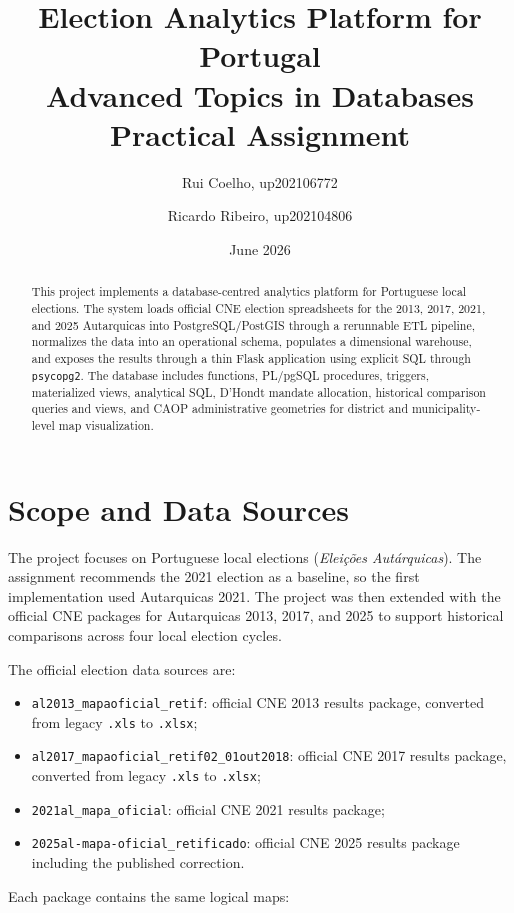 \documentclass[11pt,twocolumn]{article}
\title{\vspace{-1.1cm}\textbf{Election Analytics Platform for Portugal}\\
\large Advanced Topics in Databases Practical Assignment}
\author{
Rui Coelho, up202106772 \and
Ricardo Ribeiro, up202104806
}
\date{June 2026}
\begin{document}
\maketitle

\begin{abstract}
This project implements a database-centred analytics platform for Portuguese local elections. The system loads official CNE election spreadsheets for the 2013, 2017, 2021, and 2025 Autarquicas into PostgreSQL/PostGIS through a rerunnable ETL pipeline, normalizes the data into an operational schema, populates a dimensional warehouse, and exposes the results through a thin Flask application using explicit SQL through \texttt{psycopg2}. The database includes functions, PL/pgSQL procedures, triggers, materialized views, analytical SQL, D'Hondt mandate allocation, historical comparison queries and views, and CAOP administrative geometries for district and municipality-level map visualization.
\end{abstract}

\section{Scope and Data Sources}

The project focuses on Portuguese local elections (\emph{Eleições Autárquicas}). The assignment recommends the 2021 election as a baseline, so the first implementation used Autarquicas 2021. The project was then extended with the official CNE packages for Autarquicas 2013, 2017, and 2025 to support historical comparisons across four local election cycles.

The official election data sources are:

\begin{itemize}
  \item \texttt{al2013\_mapaoficial\_retif}: official CNE 2013 results package, converted from legacy \texttt{.xls} to \texttt{.xlsx};
  \item \texttt{al2017\_mapaoficial\_retif02\_01out2018}: official CNE 2017 results package, converted from legacy \texttt{.xls} to \texttt{.xlsx};
  \item \texttt{2021al\_mapa\_oficial}: official CNE 2021 results package;
  \item \texttt{2025al-mapa-oficial\_retificado}: official CNE 2025 results package including the published correction.
\end{itemize}

Each package contains the same logical maps:
\end{document}
